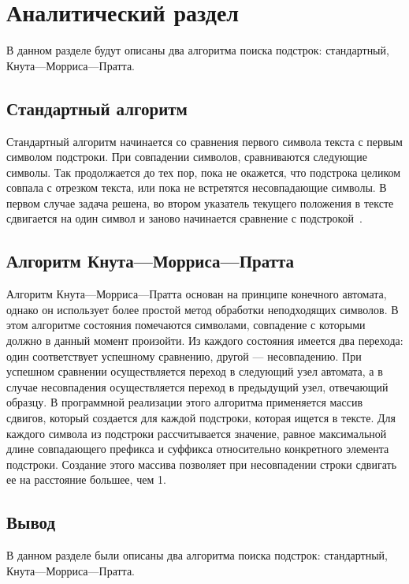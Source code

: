 \chapter{Аналитический раздел}

В данном разделе будут описаны два алгоритма поиска подстрок: стандартный, Кнута---Морриса---Пратта.

\section{Стандартный алгоритм}
Стандартный алгоритм начинается со сравнения первого символа текста с первым символом подстроки. При совпадении символов, сравниваются следующие символы. Так продолжается до тех пор, пока не окажется, что подстрока целиком совпала с отрезком текста, или пока не встретятся несовпадающие символы. В первом случае задача решена, во втором указатель текущего положения в тексте сдвигается на один символ и заново начинается сравнение с подстрокой~\cite{aa}.

\section{Алгоритм Кнута---Морриса---Пратта}
Алгоритм Кнута---Морриса---Пратта основан на принципе конечного автомата, однако он использует более простой метод обработки неподходящих символов.
В этом алгоритме состояния помечаются символами, совпадение с которыми должно в данный момент произойти. 
Из каждого состояния имеется два перехода: один соответствует успешному сравнению, другой --- несовпадению. 
При успешном сравнении осуществляется переход в следующий узел автомата, а в случае несовпадения осуществляется переход в предыдущий узел, отвечающий образцу. 
В программной реализации этого алгоритма применяется массив сдвигов, который создается для каждой подстроки, которая ищется в тексте.
Для каждого символа из подстроки рассчитывается значение, равное максимальной длине совпадающего префикса и суффикса относительно конкретного элемента подстроки. Создание этого массива позволяет при несовпадении строки сдвигать ее на расстояние большее, чем 1.


\section*{Вывод}

В данном разделе были описаны два алгоритма поиска подстрок: стандартный, Кнута---Морриса---Пратта.
